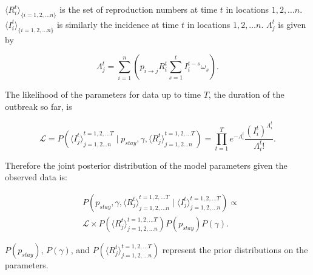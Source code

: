 \documentclass[9pt,twocolumn,twoside,lineno]{pnas-new}
\begin{document}
{\({\langle R_{i}^{t} \rangle}_{\{i = 1, 2, \dots n\}}\) is the set of
reproduction numbers at time \(t\) in locations \(1, 2, \dots n\).
\({\langle I_{i}^{t} \rangle}_{\{i = 1, 2, \dots n\}}\) is similarly the
incidence at time \(t\) in locations \(1, 2, \dots
n\). \(\Lambda_{j}^{t}\) is given by

\begin{equation}
\Lambda_{j}^{t} = \sum\limits_{i = 1}^n{\left(p_{i \rightarrow j}R_{i}^{t} \sum_{s
        = 1}^t{I_{i}^{t - s} \omega_{s}} \right)}.
\label{eq:lambdajt}
\end{equation} 

The likelihood of the parameters for data up to time $T$, the duration
of the outbreak so far, is

\begin{equation*}
  \mathcal{L} = P
  \left(
    {\langle I_{j}^{t} \rangle}_{j = 1, 2 \dots n}^{t = 1, 2, \dots T} \mid
    p_{stay},
    \gamma,
    {\langle R_{j}^{t} \rangle}_{j = 1, 2 \dots n}^{t = 1, 2, \dots T}\right) = 
     \prod_{t = 1}^{T}{e^{-\Lambda_{i}^{t}} 
       \frac{\left(I_{i}^{t}\right)^{\Lambda_{i}^{t}}}{\Lambda_{i}^{t} !}}.
  \end{equation*}

Therefore the joint posterior distribution of the model parameters 
given the observed data is:

\begin{equation*}
  \begin{aligned}
  & P\left(p_{stay}, \gamma, {\langle R_{j}^{t}\rangle}_{j = 1, 2, \dots n}^{t = 1, 2, \dots T}
   \mid 
   \langle I_{j}^{t}\rangle_{j = 1, 2, \dots n}^{t = 1, 2, \dots T} \right)
   \propto  \\
   & \mathcal{L} \times 
   P\left(\langle R_{j}^{t}\rangle_{j = 1, 2, \dots n}^{t = 1, 2, \dots T}\right) 
   P\left( p_{stay} \right) P\left( \gamma \right).
   \end{aligned}
\end{equation*}


\(P\left( p_{stay} \right)\), \(P\left( \gamma \right)\), and
\(P\left(\langle R_{j}^{t}\rangle_{j = 1, 2, \dots n}^{t = 1, 2, \dots T}\right)\) represent
the prior distributions on the parameters.

}
\end{document}
